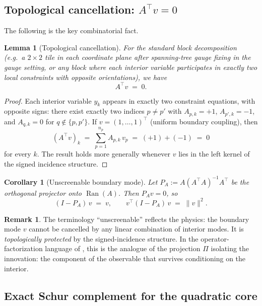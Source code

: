 \documentclass[11pt]{article}
\newtheorem{lemma}[theorem]{Lemma}
\newtheorem{corollary}[theorem]{Corollary}
\theoremstyle{definition}
\newtheorem{remark}[theorem]{Remark}
\newcommand{\1}{\mathbf{1}}
\newcommand{\Ran}{\operatorname{Ran}}
\newcommand{\norm}[1]{\lVert #1\rVert}
\begin{document}
\subsection{Topological cancellation: $A^\top v=0$}

The following is the key combinatorial fact.

\begin{lemma}[Topological cancellation]\label{lem:Atv0}
For the standard block decomposition (e.g.\ a $2\times 2$ tile in each coordinate plane after
spanning-tree gauge fixing in the gauge setting, or any block where each interior variable
participates in exactly two local constraints with opposite orientations), we have
\[
A^\top v \;=\; 0.
\]
\end{lemma}

\begin{proof}
Each interior variable $y_k$ appears in exactly two constraint equations, with opposite signs:
there exist exactly two indices $p\ne p'$ with $A_{p,k}=+1$, $A_{p',k}=-1$, and
$A_{q,k}=0$ for $q\notin\{p,p'\}$.  If $v=(1,\ldots,1)^\top$ (uniform boundary coupling), then
\[
(A^\top v)_k \;=\; \sum_{p=1}^{n_p} A_{p,k}\,v_p \;=\; (+1)+(-1) \;=\; 0
\]
for every $k$.  The result holds more generally whenever $v$ lies in the left kernel of the
signed incidence structure.
\end{proof}

\begin{corollary}[Unscreenable boundary mode]\label{cor:unscreen}
Let $P_A := A(A^\top A)^{-1}A^\top$ be the orthogonal projector onto $\Ran(A)$.  Then
$P_A v = 0$, so
\[
(I - P_A)\,v \;=\; v,\qquad v^\top(I-P_A)\,v \;=\; \norm{v}^2.
\]
\end{corollary}

\begin{remark}
The terminology ``unscreenable'' reflects the physics: the boundary mode $v$ cannot be
cancelled by any linear combination of interior modes.  It is \emph{topologically protected}
by the signed-incidence structure.  In the operator-factorization language of
\cite{Fontes2026I,Fontes2026II}, this is the analogue of the projection $\Pi$ isolating the
innovation: the component of the observable that survives conditioning on the interior.
\end{remark}

\subsection{Exact Schur complement for the quadratic core}
\end{document}
